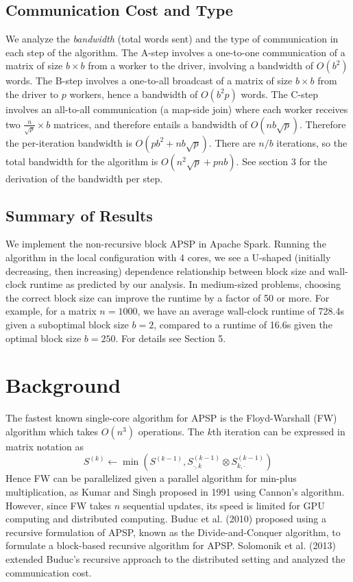 \documentclass{article} %
\begin{document}
\subsection{Communication Cost and Type}

We analyze the \emph{bandwidth} (total words sent) and the type of
communication in each step of the algorithm.  The A-step involves a
one-to-one communication of a matrix of size $b \times b$ from a
worker to the driver, involving a bandwidth of $O(b^2)$ words.  The
B-step involves a one-to-all broadcast of a matrix of size $b\times b$
from the driver to $p$ workers, hence a bandwidth of $O(b^2 p)$ words.
The C-step involves an all-to-all communication (a map-side join)
where each worker receives two $\frac{n}{\sqrt{p}} \times b$ matrices, and
therefore entails a bandwidth of $O(nb\sqrt{p})$.  Therefore the
per-iteration bandwidth is $O(pb^2 + nb\sqrt{p})$.
There are $n/b$ iterations, so the total bandwidth for the algorithm
is $O(n^2\sqrt{p} + pnb)$.  See section 3 for the
derivation of the bandwidth per step.

\subsection{Summary of Results}

We implement the non-recursive block APSP in Apache Spark.
Running the algorithm in the local configuration with 4 cores, we see a U-shaped (initially decreasing, then increasing) dependence relationship between block size and wall-clock runtime as predicted by our analysis.
In medium-sized problems, choosing the correct block size can improve the runtime by a factor of 50 or more.
For example, for a matrix $n = 1000$, we have an average wall-clock runtime of 728.4s given a suboptimal block size $b = 2$, compared to a runtime of 16.6s given the optimal block size $b = 250$.
For details see Section 5.

\section{Background}

The fastest known single-core algorithm for APSP is the Floyd-Warshall (FW)
algorithm which takes $O(n^3)$ operations.  The $k$th iteration can be
expressed in matrix notation as
\[
S^{(k)} \leftarrow \min(S^{(k-1)}, S^{(k-1)}_{\cdot, k} \otimes S^{(k-1)}_{k, \cdot})
\]
Hence FW can be parallelized given a parallel algorithm for min-plus
multiplication, as Kumar and Singh proposed in 1991 using Cannon's
algorithm.  However, since FW takes $n$ sequential updates, its speed
is limited for GPU computing and distributed computing.  Buduc et
al. (2010) proposed using a recursive formulation of APSP, known as
the Divide-and-Conquer algorithm, to formulate a block-based recursive
algorithm for APSP.  Solomonik et al. (2013) extended Buduc's
recursive approach to the distributed setting and analyzed the
communication cost.
\end{document}
